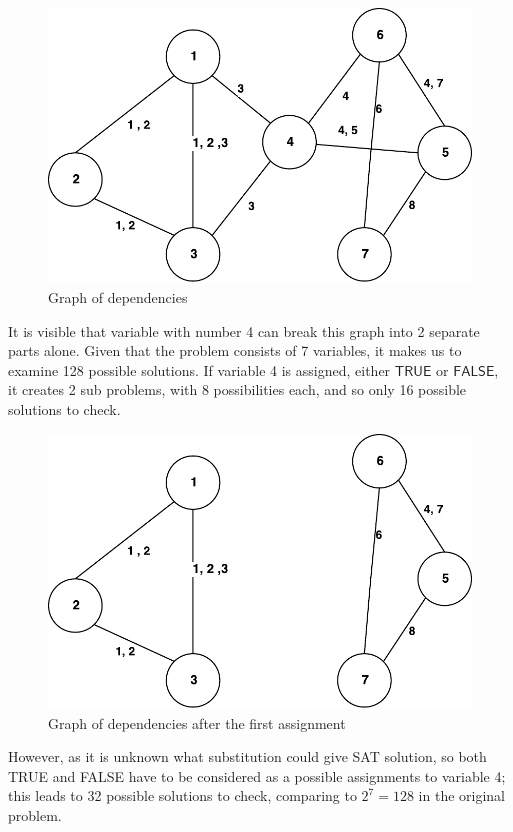 \documentclass[12pt,english,pdflatex]{aghdpl}
\begin{document}
\begin{figure}[H]
\begin{centering}
\includegraphics{img/graph1}
\par\end{centering}
\caption{Graph of dependencies}
\end{figure}

It is visible that variable with number 4 can break this graph into
2 separate parts alone. Given that the problem consists of 7 variables, it makes us to examine 128 possible solutions. If variable 4 is assigned, either
$\mathsf{TRUE}$ or $\mathsf{FALSE}$, it creates 2 sub problems, with 8 possibilities each, and so only 16 possible solutions to check. 

\begin{figure}[H]
\begin{centering}
\includegraphics{img/graph2}
\par\end{centering}
\caption{Graph of dependencies after the first assignment}
\end{figure}
However, as it is unknown what substitution could give SAT solution,
so both TRUE and FALSE have  to be considered as a possible assignments to variable 4; this leads
to 32 possible solutions to check, comparing to $2^{7}=128$ in the original problem.
\end{document}
